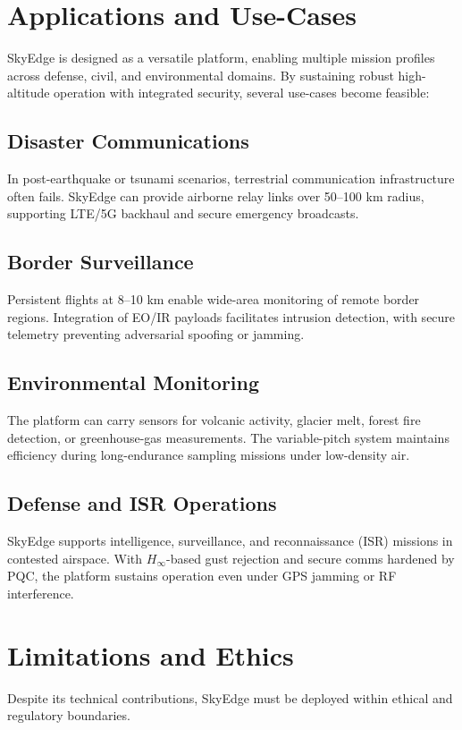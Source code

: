 \documentclass[conference]{IEEEtran}
\begin{document}
\section{Applications and Use-Cases}
SkyEdge is designed as a versatile platform, enabling multiple mission
profiles across defense, civil, and environmental domains. By sustaining
robust high-altitude operation with integrated security, several
use-cases become feasible:  

\subsection{Disaster Communications}
In post-earthquake or tsunami scenarios, terrestrial communication
infrastructure often fails. SkyEdge can provide airborne relay links
over 50--100 km radius, supporting LTE/5G backhaul and secure emergency
broadcasts.  

\subsection{Border Surveillance}
Persistent flights at 8--10 km enable wide-area monitoring of remote
border regions. Integration of EO/IR payloads facilitates intrusion
detection, with secure telemetry preventing adversarial spoofing or
jamming.  

\subsection{Environmental Monitoring}
The platform can carry sensors for volcanic activity, glacier melt,
forest fire detection, or greenhouse-gas measurements. The variable-pitch
system maintains efficiency during long-endurance sampling missions
under low-density air.  

\subsection{Defense and ISR Operations}
SkyEdge supports intelligence, surveillance, and reconnaissance (ISR)
missions in contested airspace. With $H_\infty$-based gust rejection and
secure comms hardened by PQC, the platform sustains operation even under
GPS jamming or RF interference.  

\section{Limitations and Ethics}
Despite its technical contributions, SkyEdge must be deployed within
ethical and regulatory boundaries.  
\end{document}

